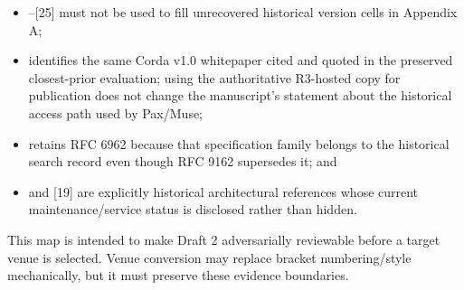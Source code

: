\documentclass[11pt]{article}
\begin{document}
\begin{itemize}
\item [20]--[25] must not be used to fill unrecovered historical version cells in Appendix A;
\item [3] identifies the same Corda v1.0 whitepaper cited and quoted in the preserved closest-prior evaluation; using the authoritative R3-hosted copy for publication does not change the manuscript's statement about the historical access path used by Pax/Muse;
\item [16] retains RFC 6962 because that specification family belongs to the historical search record even though RFC 9162 supersedes it; and
\item [18] and [19] are explicitly historical architectural references whose current maintenance/service status is disclosed rather than hidden.
\end{itemize}

This map is intended to make Draft 2 adversarially reviewable before a target venue is selected. Venue conversion may replace bracket numbering/style mechanically, but it must preserve these evidence boundaries.
\end{document}
